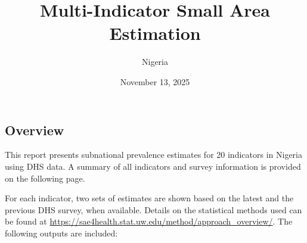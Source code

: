 \documentclass[
]{article}
\title{Multi-Indicator Small Area Estimation}
\subtitle{Nigeria}
\author{}
\date{\vspace{-2.5em}November 13, 2025}
\begin{document}
\maketitle

{
\setcounter{tocdepth}{2}
\tableofcontents
}
\clearpage

\subsection{Overview}\label{overview}

This report presents subnational prevalence estimates for 20 indicators in Nigeria using DHS data. A summary of all indicators and survey information is provided on the following page.

For each indicator, two sets of estimates are shown based on the latest and the previous DHS survey, when available. Details on the statistical methods used can be found at \url{https://sae4health.stat.uw.edu/method/approach_overview/}. The following outputs are included:
\end{document}
